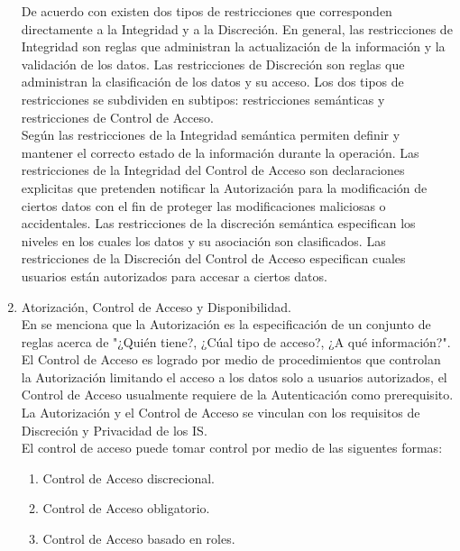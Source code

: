 \documentclass[runningheads,a4paper]{llncs}
\begin{document}
\begin{enumerate}
De acuerdo con \cite{CoSMoIntroduction} existen dos tipos de restricciones que corresponden directamente a la Integridad y a la Discreción. En general, las restricciones de Integridad son reglas que administran la actualización de la información y la validación de los datos. Las restricciones de Discreción son reglas que administran la clasificación de los datos y su acceso. Los dos tipos de restricciones se subdividen en subtipos: restricciones semánticas y restricciones de Control de Acceso.\\

Según \cite{CoSMoIntroduction} las restricciones de la Integridad semántica permiten definir y mantener el correcto estado de la información durante la operación. Las restricciones de la Integridad del Control de Acceso son declaraciones explicitas que pretenden notificar la Autorización para la modificación de ciertos datos con el fin de proteger las modificaciones maliciosas o accidentales. Las restricciones de la discreción semántica especifican los niveles en los cuales los datos y su asociación son clasificados. Las restricciones de la Discreción del Control de Acceso especifican cuales usuarios están autorizados para accesar a ciertos datos.\\

	\item Atorización, Control de Acceso y Disponibilidad.\\

En \cite{CoSMoIntroduction} se menciona que la Autorización es la especificación de un conjunto de reglas acerca de "¿Quién tiene?, ¿Cúal tipo de acceso?, ¿A qué información?". El Control de Acceso es logrado por medio de procedimientos que controlan la Autorización  limitando el acceso a los datos solo a usuarios autorizados, el Control de Acceso usualmente requiere de la Autenticación como prerequisito. La Autorización y el Control de Acceso se vinculan con los requisitos de Discreción y Privacidad de los \gls{IS}.\\

El control de acceso puede tomar control por medio de las siguentes formas:\\

\begin{enumerate}
	\item Control de Acceso discrecional.
	\item Control de Acceso obligatorio.
	\item Control de Acceso basado en roles.\\
\end{enumerate}


\end{enumerate}
\end{document}
